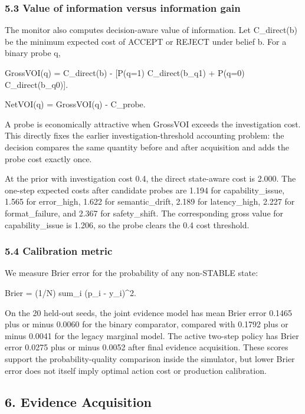 \documentclass[
]{article}
\begin{document}
\subsubsection{5.3 Value of information versus information gain}\label{53-value-of-information-versus-information-gain}

The monitor also computes decision-aware value of information. Let C\_direct(b) be the minimum expected cost of ACCEPT or REJECT under belief b. For a binary probe q,

GrossVOI(q) = C\_direct(b) - {[}P(q=1) C\_direct(b\_q1) + P(q=0) C\_direct(b\_q0){]}.

NetVOI(q) = GrossVOI(q) - C\_probe.

A probe is economically attractive when GrossVOI exceeds the investigation cost. This directly fixes the earlier investigation-threshold accounting problem: the decision compares the same quantity before and after acquisition and adds the probe cost exactly once.

At the prior with investigation cost 0.4, the direct state-aware cost is 2.000. The one-step expected costs after candidate probes are 1.194 for capability\_issue, 1.565 for error\_high, 1.622 for semantic\_drift, 2.189 for latency\_high, 2.227 for format\_failure, and 2.367 for safety\_shift. The corresponding gross value for capability\_issue is 1.206, so the probe clears the 0.4 cost threshold.

\subsubsection{5.4 Calibration metric}\label{54-calibration-metric}

We measure Brier error for the probability of any non-STABLE state:

Brier = (1/N) sum\_i (p\_i - y\_i)\^{}2.

On the 20 held-out seeds, the joint evidence model has mean Brier error 0.1465 plus or minus 0.0060 for the binary comparator, compared with 0.1792 plus or minus 0.0041 for the legacy marginal model. The active two-step policy has Brier error 0.0275 plus or minus 0.0052 after final evidence acquisition. These scores support the probability-quality comparison inside the simulator, but lower Brier error does not itself imply optimal action cost or production calibration.

\subsection{6. Evidence Acquisition}\label{6-evidence-acquisition}
\end{document}

